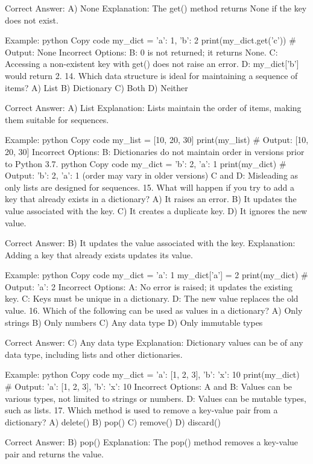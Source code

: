 Correct Answer: A) None
Explanation: The get() method returns None if the key does not exist.

Example:
python
Copy code
my_dict = {'a': 1, 'b': 2}
print(my_dict.get('c'))  # Output: None
Incorrect Options:
B: 0 is not returned; it returns None.
C: Accessing a non-existent key with get() does not raise an error.
D: my_dict['b'] would return 2.
14. Which data structure is ideal for maintaining a sequence of items?
A) List
B) Dictionary
C) Both
D) Neither

Correct Answer: A) List
Explanation: Lists maintain the order of items, making them suitable for sequences.

Example:
python
Copy code
my_list = [10, 20, 30]
print(my_list)  # Output: [10, 20, 30]
Incorrect Options:
B: Dictionaries do not maintain order in versions prior to Python 3.7.
python
Copy code
my_dict = {'b': 2, 'a': 1}
print(my_dict)  # Output: {'b': 2, 'a': 1} (order may vary in older versions)
C and D: Misleading as only lists are designed for sequences.
15. What will happen if you try to add a key that already exists in a dictionary?
A) It raises an error.
B) It updates the value associated with the key.
C) It creates a duplicate key.
D) It ignores the new value.

Correct Answer: B) It updates the value associated with the key.
Explanation: Adding a key that already exists updates its value.

Example:
python
Copy code
my_dict = {'a': 1}
my_dict['a'] = 2
print(my_dict)  # Output: {'a': 2}
Incorrect Options:
A: No error is raised; it updates the existing key.
C: Keys must be unique in a dictionary.
D: The new value replaces the old value.
16. Which of the following can be used as values in a dictionary?
A) Only strings
B) Only numbers
C) Any data type
D) Only immutable types

Correct Answer: C) Any data type
Explanation: Dictionary values can be of any data type, including lists and other dictionaries.

Example:
python
Copy code
my_dict = {'a': [1, 2, 3], 'b': {'x': 10}}
print(my_dict)  # Output: {'a': [1, 2, 3], 'b': {'x': 10}}
Incorrect Options:
A and B: Values can be various types, not limited to strings or numbers.
D: Values can be mutable types, such as lists.
17. Which method is used to remove a key-value pair from a dictionary?
A) delete()
B) pop()
C) remove()
D) discard()

Correct Answer: B) pop()
Explanation: The pop() method removes a key-value pair and returns the value.

